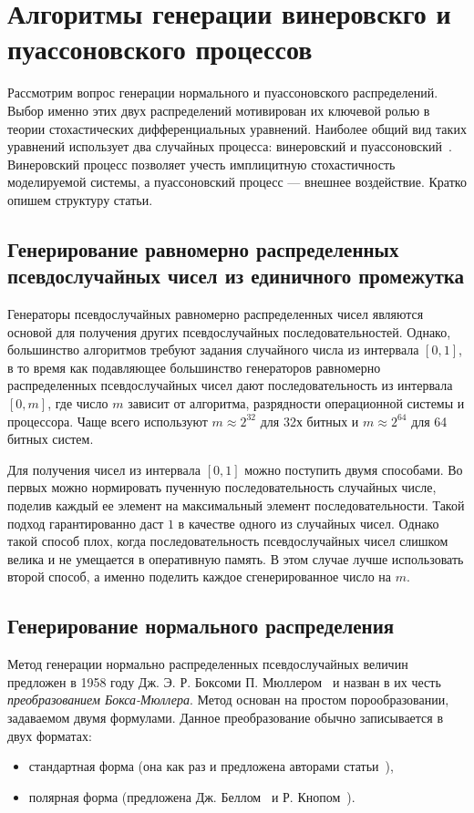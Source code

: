\documentclass[%
floatfix,
showkeys,
nofootinbib, %
superscriptaddress, %
]{revtex4-1}
\begin{document}
\section{Алгоритмы генерации винеровскго и пуассоновского процессов}

Рассмотрим вопрос генерации нормального и пуассоновского
распределений. Выбор именно этих двух распределений мотивирован их
ключевой ролью в теории стохастических дифференциальных
уравнений. Наиболее общий вид таких уравнений использует два случайных
процесса: винеровский и
пуассоновский~\cite{L_Platen_Bruti}. Винеровский процесс позволяет
учесть имплицитную стохастичность моделируемой системы, а
пуассоновский процесс --- внешнее воздействие. Кратко опишем структуру
статьи.

\subsection{Генерирование равномерно распределенных псевдослучайных чисел из единичного промежутка}

Генераторы псевдослучайных равномерно распределенных чисел являются
основой для получения других псевдослучайных
последовательностей. Однако, большинство алгоритмов требуют задания
случайного числа из интервала $[0,1]$, в то время как подавляющее
большинство генераторов равномерно распределенных псевдослучайных
чисел дают последовательность из интервала $[0, m]$, где число $m$
зависит от алгоритма, разрядности операционной системы и процессора.
Чаще всего используют $m \approx 2^{32}$ для 32х битных и
$m \approx 2^{64}$ для 64 битных систем.

Для получения чисел из интервала $[0, 1]$ можно поступить двумя
способами. Во первых можно нормировать пученную последовательность
случайных числе, поделив каждый ее элемент на максимальный элемент
последовательности. Такой подход гарантированно даст $1$ в качестве
одного из случайных чисел. Однако такой способ плох, когда
последовательность псевдослучайных чисел слишком велика и не умещается
в оперативную память. В этом случае лучше использовать второй способ,
а именно поделить каждое сгенерированное число на $m$.

\subsection{Генерирование нормального распределения}

Метод генерации нормально распределенных псевдослучайных величин
предложен в 1958 году Дж. Э. Р. Боксоми
П. Мюллером~\cite{L_BoxMuller:1958} и назван в их честь
\emph{преобразованием Бокса-Мюллера}. Метод основан на простом
порообразовании, задаваемом двумя формулами. Данное преобразование
обычно записывается в двух форматах:
\begin{itemize}
  \item стандартная форма (она как раз и предложена авторами статьи~\cite{L_BoxMuller:1958}),
  \item полярная форма (предложена Дж. Беллом~\cite{L_Bell:1968} и Р. Кнопом~\cite{L_Knop:1969}).
\end{itemize}
\end{document}
